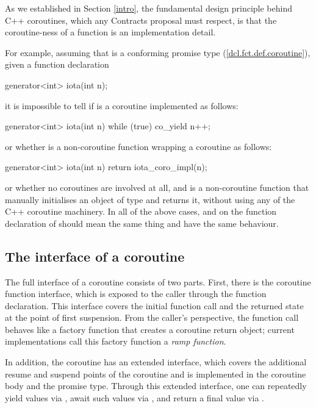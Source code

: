 As we established in Section \ref{intro}, the fundamental design principle behind C++ coroutines, which any Contracts proposal must respect, is that the coroutine-ness of a function  is an implementation detail.

For example, assuming that  is a conforming promise type (\href{https://eel.is/c++draft/dcl.fct.def.coroutine}{[dcl.fct.def.coroutine]}), given a function declaration 
\begin{codeblock}
generator<int> iota(int n); 
\end{codeblock}
it is impossible to tell if  is a coroutine implemented as follows:
\begin{codeblock}
generator<int> iota(int n) {
  while (true)
    co_yield n++;
}
\end{codeblock}
or whether  is a non-coroutine function wrapping a coroutine  as follows:
\begin{codeblock}
generator<int> iota(int n) {
  return iota_coro_impl(n);
}
\end{codeblock}
or whether no coroutines are involved at all, and  is a non-coroutine function that manually initialises an object of type  and returns it, without using any of the C++ coroutine machinery. In all of the above cases,  and  on the function declaration of  should mean the same thing and have the same behaviour.

\subsection{The interface of a coroutine}

The full interface of a coroutine consists of two parts. First, there is the coroutine function interface, which is exposed to the caller through the function declaration. This interface covers the initial function call and the returned state at the point of first suspension. From the caller's perspective, the function call behaves like a factory function that creates a coroutine return object; current implementations call this factory function a \emph{ramp function}.

In addition, the coroutine has an extended interface, which covers the additional resume and suspend points of the coroutine and is implemented in the coroutine body and the promise type.  Through this extended interface, one can repeatedly yield values via , await such values via , and return a final value via .


